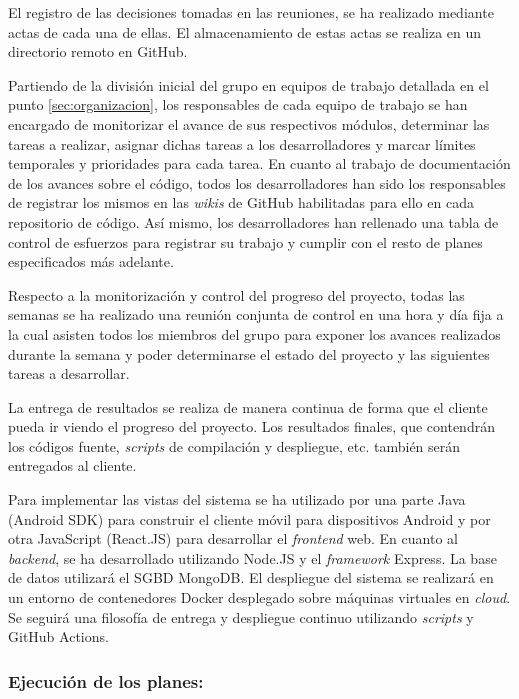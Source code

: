 \documentclass{article}
\begin{document}
El registro de las decisiones tomadas en las reuniones, se ha realizado mediante actas de cada una de ellas. El almacenamiento de estas actas se realiza en un directorio remoto en GitHub.
 
Partiendo de la división inicial del grupo en equipos de trabajo detallada en el punto \ref{sec:organizacion}, los responsables de cada equipo de trabajo se han encargado de monitorizar el avance de sus respectivos módulos, determinar las tareas a realizar, asignar dichas tareas a los desarrolladores y marcar límites temporales y prioridades para cada tarea. En cuanto al trabajo de documentación de los avances sobre el código, todos los desarrolladores han sido los responsables de registrar los mismos en las \textit{wikis} de GitHub habilitadas para ello en cada repositorio de código. Así mismo, los desarrolladores han rellenado una tabla de control de esfuerzos para registrar su trabajo y cumplir con el resto de planes especificados más adelante.
 
\pagebreak
 
Respecto a la monitorización y control del progreso del proyecto, todas las semanas se ha realizado una reunión conjunta de control en una hora y día fija a la cual asisten todos los miembros del grupo para exponer los avances realizados durante la semana y poder determinarse el estado del proyecto y las siguientes tareas a desarrollar.
 
La entrega de resultados se realiza de manera continua de forma que el cliente pueda ir viendo el progreso del proyecto. Los resultados finales, que contendrán los códigos fuente, \textit{scripts} de compilación y despliegue, etc. también serán entregados al cliente.
 
Para implementar las vistas del sistema se ha utilizado por una parte Java (Android SDK) para construir el cliente móvil para dispositivos Android y por otra JavaScript (React.JS) para desarrollar el \textit{frontend} web. En cuanto al \textit{backend}, se ha desarrollado utilizando Node.JS y el \textit{framework} Express. La base de datos utilizará el SGBD MongoDB. El despliegue del sistema se realizará en un entorno de contenedores Docker desplegado sobre máquinas virtuales en \textit{cloud}. Se seguirá una filosofía de entrega y despliegue continuo utilizando \textit{scripts} y GitHub Actions.
 
\subsubsection*{Ejecución de los planes:}
 
\end{document}
